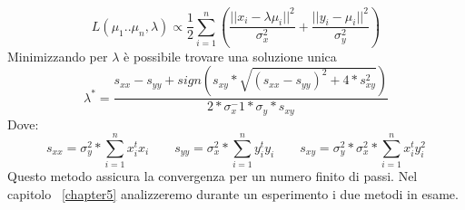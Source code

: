 \begin{equation}
L(\mu_1..\mu_n,\lambda)  \propto \frac{1}{2} \sum\limits_{i=1}^n (\frac{|| x_i - \lambda \mu_i ||^2}{\sigma_x^2}+ \frac{|| y_i - \mu_i|| ^2}{\sigma_y^2})
\label{funzione da minimizzare}
\end{equation}
Minimizzando per $\lambda$ è possibile trovare una soluzione unica
\begin{equation}
\lambda^* = \frac{s_{xx} - s_{yy} + sign(s_{xy}*\sqrt{(s_{xx} - s_{yy})^2 + 4*s_{xy}^2})}{2*\sigma_x^-1 * \sigma_y * s_{xy}}
\label{stima della scala per lo stimatore ML}
\end{equation}
Dove:
\begin{equation}
s_{xx} = \sigma_y^2*\sum\limits_{i=1}^n x_i^t x_i	\qquad
s_{yy} = \sigma_x^2*\sum\limits_{i=1}^n y_i^t y_i	\qquad
s_{xy} = \sigma_y^2*\sigma_x^2 *\sum\limits_{i=1}^n x_i^t y_i^2
\label{}
\end{equation}
Questo metodo assicura la convergenza per un numero finito di passi. Nel capitolo ~\ref{chapter5} analizzeremo durante un esperimento i due metodi in esame.


